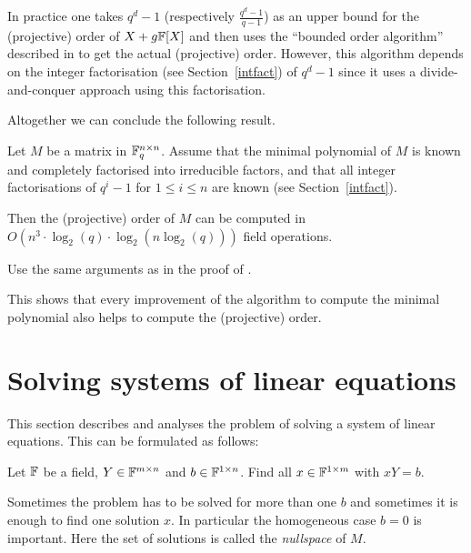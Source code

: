 In practice one takes $q^d-1$ (respectively $\frac{q^d-1}{q-1}$) 
as an upper bound
for the (projective) order of $X+g\mathbb{F}[X]$ and then uses the ``bounded order
algorithm'' described in \cite[Section 2]{CellLeedOrder} to get the
actual (projective) order. However, this algorithm depends on the
integer factorisation (see Section~\ref{intfact}) 
of $q^d-1$ since it uses a divide-and-conquer
approach using this factorisation.

Altogether we can conclude the following result.

\begin{Prop}
%
Let $M$ be a matrix in\/ $\mathbb{F}_q^{n \times n}$. Assume that the 
minimal polynomial of $M$ is known and completely factorised into
%
irreducible factors, and that all integer factorisations of $q^i-1$
for $1 \le i \le n$ are known (see Section~\ref{intfact}). 

Then the (projective) order of $M$ can be
computed in $O(n^3 \cdot \log_2(q) \cdot \log_2(n\log_2(q)))$
field operations.
\end{Prop}
\proofbeg Use the same arguments as in the proof of 
\cite[\textsc{Order Algorithm}]{CellLeedOrder}. 
\proofend

\begin{Rem}
This shows that every improvement of the algorithm to compute the
minimal polynomial also helps to compute the (projective) order.
%
\end{Rem}

\section{Solving systems of linear equations}
\label{sec:syslineq}
%

This section describes and analyses the problem of solving a system
of linear equations. This can be formulated as follows:

Let $\mathbb{F}$ be a field, $Y \in \mathbb{F}^{m \times n}$ and $b \in \mathbb{F}^{1 \times n}$.
Find all $x \in \mathbb{F}^{1 \times m}$ with $xY = b$.

Sometimes the problem has to be solved for more than one $b$ and sometimes
it is enough to find one solution $x$. In particular the homogeneous case 
$b=0$ is important. Here the set of solutions is called the \emph{nullspace}
of $M$.
%

